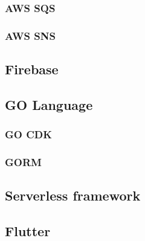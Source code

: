 \subsubsection{AWS SQS}
\subsubsection{AWS SNS}
\subsection{Firebase}
\subsection{GO Language}
\subsubsection{GO CDK}
\subsubsection{GORM}
\subsection{Serverless framework}
\subsection{Flutter}
